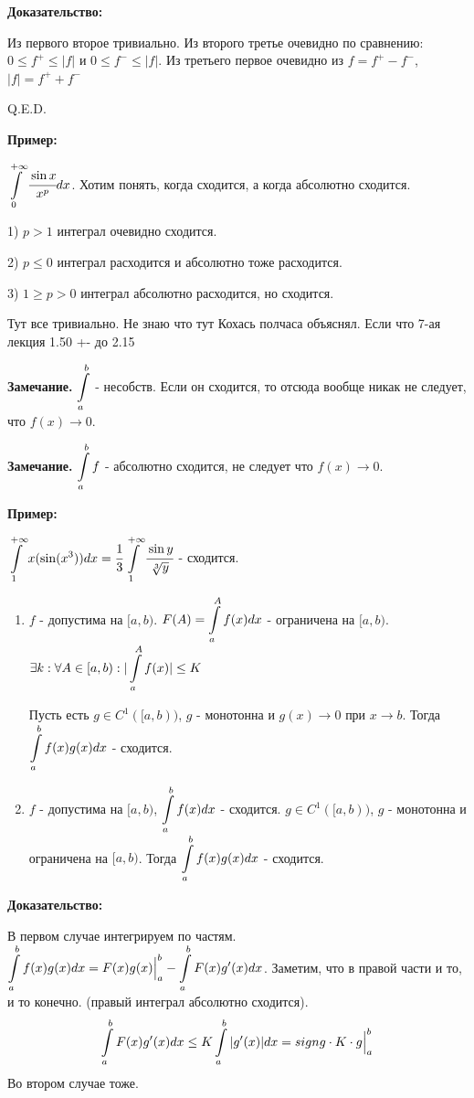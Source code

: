 \textbf{Доказательство:}

Из первого второе тривиально. Из второго третье очевидно по сравнению: $0\leq f^+ \leq |f|$ и $0\leq f^{-}\leq |f|$. Из третьего первое очевидно из $f =f^+ - f^-$, $|f| = f^{+} + f^{-}$

\hfill Q.E.D.

\textbf{Пример:}

$\displaystyle\int\limits_{0}^{+\infty}\cfrac{\sin x}{x^p}dx$. Хотим понять, когда сходится, а когда абсолютно сходится.

1)  $p>1$ интеграл очевидно сходится.

2) $p\leq 0$ интеграл расходится и абсолютно тоже расходится.

3) $1 \geq p >0 $ интеграл абсолютно расходится, но сходится. 

Тут все тривиально. Не знаю что тут Кохась полчаса объяснял. Если что 7-ая лекция 1.50 +- до 2.15

\textbf{Замечание.} $\displaystyle\int\limits_{a}^{b}$ - несобств. Если он сходится, то отсюда вообще никак не следует, что $f(x) \rightarrow 0$.

\textbf{Замечание.} $\displaystyle\int\limits_{a}^{b} f$ - абсолютно сходится, не следует  что $f(x) \rightarrow 0 $.

\textbf{Пример:}

$\displaystyle\int\limits_{1}^{+\infty} x (\sin (x^3))dx = \cfrac{1}{3}\displaystyle\int\limits_{1}^{+\infty} \cfrac{\sin y}{\sqrt[3]{y}}$ - сходится. 


\begin{enumerate}
    \item $f$ - допустима на $[a,b)$. $F(A) = \displaystyle\int\limits_{a}^{A}f(x)dx$ - ограничена на $[a,b)$. $\exists k: \forall A \in [a,b): |\displaystyle\int\limits_{a}^{A}f(x)|\leq K$
    
    Пусть есть $g\in C^1([a,b))$, $g$ - монотонна и $g(x)\rightarrow 0$ при $x\rightarrow b$. Тогда $\displaystyle\int\limits_{a}^{b} f(x) g(x)dx$ - сходится.
    \item $f$ - допустима на $[a,b)$, $\displaystyle\int\limits_{a}^{b}f(x)dx$ - сходится. $g \in C^1([a,b))$, $g$ - монотонна и ограничена на $[a,b)$. Тогда $\displaystyle\int\limits_{a}^{b} f(x) g(x)dx$ - сходится.
\end{enumerate}
\textbf{Доказательство:} 

В первом случае интегрируем по частям. $\displaystyle\int\limits_{a}^{b}f(x)g(x) dx = F(x)g(x)\Big |_a^b - \displaystyle\int\limits_{a}^{b}F(x) g'(x)dx$. Заметим, что в правой части и то, и то конечно. (правый интеграл абсолютно сходится).
$$\displaystyle\int\limits_{a}^{b}F(x) g'(x)dx \leq K\displaystyle\int\limits_{a}^{b}|g'(x)|dx = sign g \cdot K\cdot g\Big|_a^b  $$
Во втором случае тоже.

